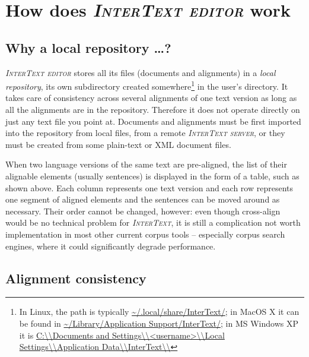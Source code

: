 \documentclass[a4paper,10pt,oneside]{book}
\newcommand{\IT}{\textit{\textsc{InterText}}\xspace}
\newcommand{\ITeditor}{\textit{\textsc{InterText editor}}\xspace}
\newcommand{\ITserver}{\textit{\textsc{InterText server}}\xspace}
\begin{document}
\chapter{How does \ITeditor work}\label{ch:intro:itbasics}

\section{Why a local repository \ldots?}\label{ch:intro:itbasics:repository}

\ITeditor stores all its files (documents and alignments) in a \emph{local repository}, its own subdirectory created somewhere\footnote{In Linux, the path is typically \url{~/.local/share/InterText/}; in MacOS X it can be found in \url{~/Library/Application Support/InterText/}; in MS Windows XP it is \url{C:\\Documents and Settings\\<username>\\Local Settings\\Application Data\\InterText\\}} in the user's directory. It takes care of consistency across several alignments of one text version as long as all the alignments are in the repository. Therefore it does not operate directly on just any text file you point at. Documents and alignments must be first imported into the repository from local files, from a remote \ITserver, or they must be created from some plain-text or XML document files.

When two language versions of the same text are pre-aligned, the list of their align\-able elements (usually sentences) is displayed in the form of a table, such as shown above. Each column represents one text version and each row represents one segment of aligned elements and the sentences can be moved around as necessary. Their order cannot be changed, however: even though cross-align would be no technical problem for \IT, it is still a complication not worth implementation in most other current corpus tools -- especially corpus search engines, where it could significantly degrade performance.

\section{Alignment consistency}\label{ch:intro:itbasics:consistency}
\end{document}
